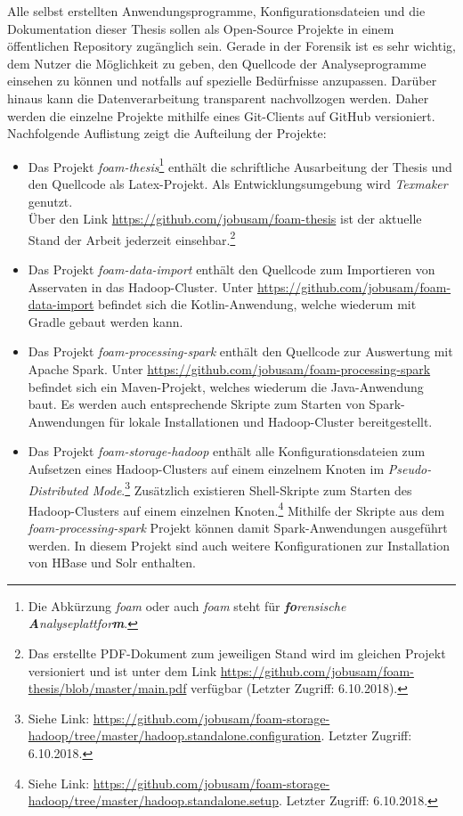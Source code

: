 \noindent
Alle selbst erstellten Anwendungsprogramme, Konfigurationsdateien und die Dokumentation dieser Thesis sollen als Open-Source Projekte in einem öffentlichen Repository zugänglich sein. Gerade in der Forensik ist es sehr wichtig, dem Nutzer die Möglichkeit zu geben, den Quellcode der Analyseprogramme einsehen zu können und notfalls auf spezielle Bedürfnisse anzupassen. Darüber hinaus kann die Datenverarbeitung transparent nachvollzogen werden.
Daher werden die einzelne Projekte mithilfe eines Git-Clients auf GitHub versioniert.\\
Nachfolgende Auflistung zeigt die Aufteilung der Projekte:
\begin{itemize}
\item Das Projekt \textit{foam-thesis}\footnote{Die Abkürzung \textit{foam} oder auch \textit{\acrshort{foam}} steht für \textit{\textbf{fo}rensische \textbf{A}nalyseplattfor\textbf{m}}.} enthält die schriftliche Ausarbeitung der Thesis und den Quellcode als Latex-Projekt. Als Entwicklungsumgebung wird \textit{Texmaker} genutzt.\\
Über den Link \url{https://github.com/jobusam/foam-thesis} ist der aktuelle Stand der Arbeit jederzeit einsehbar.\footnote{Das erstellte PDF-Dokument zum jeweiligen Stand wird im gleichen Projekt versioniert und ist unter dem Link \url{https://github.com/jobusam/foam-thesis/blob/master/main.pdf} verfügbar (Letzter Zugriff: 6.10.2018).}

\item Das Projekt \textit{foam-data-import} enthält den Quellcode zum Importieren von Asservaten in das Hadoop-Cluster. Unter \url{https://github.com/jobusam/foam-data-import} befindet sich die Kotlin-Anwendung, welche wiederum mit Gradle gebaut werden kann.

\item Das Projekt \textit{foam-processing-spark} enthält den Quellcode zur Auswertung mit Apache Spark\texttrademark. Unter \url{https://github.com/jobusam/foam-processing-spark} befindet sich ein Maven-Projekt, welches wiederum die Java-Anwendung baut. Es werden auch entsprechende Skripte zum Starten von Spark-Anwendungen für lokale Installationen und Hadoop-Cluster bereitgestellt. 

\item Das Projekt \textit{foam-storage-hadoop} enthält alle Konfigurationsdateien zum Aufsetzen eines Hadoop-Clusters auf einem einzelnem Knoten im \textit{Pseudo-Distributed Mode}.\footnote{Siehe Link: \url{https://github.com/jobusam/foam-storage-hadoop/tree/master/hadoop.standalone.configuration}. Letzter Zugriff: 6.10.2018.} Zusätzlich existieren Shell-Skripte zum Starten des Hadoop-Clusters auf einem einzelnen Knoten.\footnote{Siehe Link: \url{https://github.com/jobusam/foam-storage-hadoop/tree/master/hadoop.standalone.setup}. Letzter Zugriff: 6.10.2018.} Mithilfe der Skripte aus dem \textit{foam-processing-spark} Projekt können damit Spark-Anwendungen ausgeführt werden. In diesem Projekt sind auch weitere Konfigurationen zur Installation von HBase und Solr enthalten.
\end{itemize}


